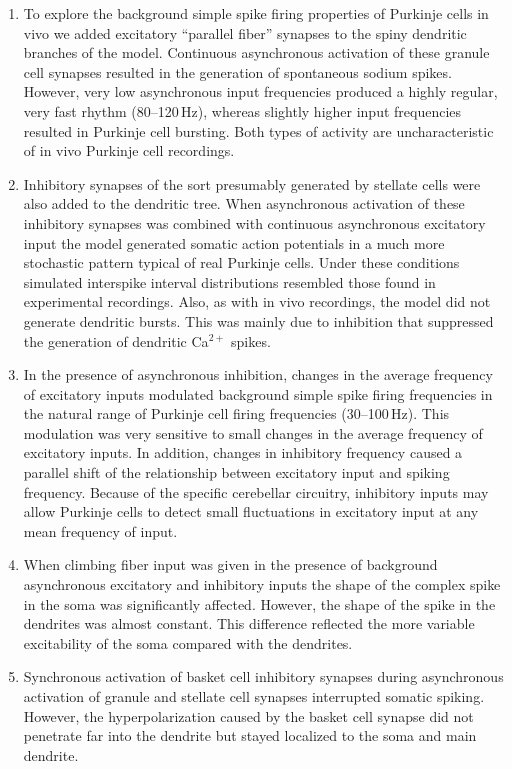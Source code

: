 \documentclass[12pt]{article}
\begin{document}
\begin{enumerate}
\item To explore the background simple spike firing properties of
Purkinje cells in vivo we added excitatory ``parallel fiber'' synapses
to the spiny dendritic branches of the model. Continuous
asynchronous activation of these granule cell synapses resulted in
the generation of spontaneous sodium spikes. However, very low
asynchronous input frequencies produced a highly regular, very
fast rhythm (80--120\,Hz), whereas slightly higher input frequencies
resulted in Purkinje cell bursting. Both types of activity are
uncharacteristic of in vivo Purkinje cell recordings.

\item Inhibitory synapses of the sort presumably generated by stellate
cells were also added to the dendritic tree. When asynchronous
activation of these inhibitory synapses was combined with
continuous asynchronous excitatory input the model generated
somatic action potentials in a much more stochastic pattern typical
of real Purkinje cells. Under these conditions simulated interspike
interval distributions resembled those found in experimental
recordings. Also, as with in vivo recordings, the model did not
generate dendritic bursts. This was mainly due to inhibition that
suppressed the generation of dendritic Ca$^{2+}$ spikes.

\item In the presence of asynchronous inhibition, changes in the
average frequency of excitatory inputs modulated background simple
spike firing frequencies in the natural range of Purkinje cell
firing frequencies (30--100\,Hz). This modulation was very sensitive
to small changes in the average frequency of excitatory inputs.
In addition, changes in inhibitory frequency caused a parallel shift
of the relationship between excitatory input and spiking frequency.
Because of the specific cerebellar circuitry, inhibitory inputs
may allow Purkinje cells to detect small fluctuations in excitatory
input at any mean frequency of input.

\item When climbing fiber input was given in the presence of
background asynchronous excitatory and inhibitory inputs the
shape of the complex spike in the soma was significantly affected.
However, the shape of the spike in the dendrites was almost constant.
This difference reflected the more variable excitability of the
soma compared with the dendrites.

\item Synchronous activation of basket cell inhibitory synapses
during asynchronous activation of granule and stellate cell synapses
interrupted somatic spiking. However, the hyperpolarization
caused by the basket cell synapse did not penetrate far into the
dendrite but stayed localized to the soma and main dendrite.


\end{enumerate}
\end{document}
